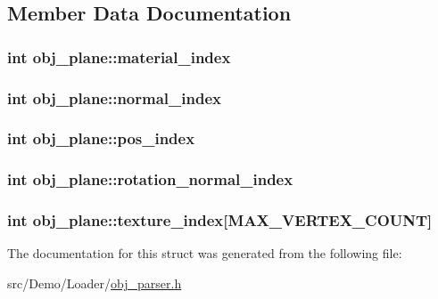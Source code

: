\subsection{Member Data Documentation}
\hypertarget{structobj__plane_ae0783771277bc7c8b2b8743015104291}{
\subsubsection[{material\+\_\+index}]{\setlength{\rightskip}{0pt plus 5cm}int obj\+\_\+plane\+::material\+\_\+index}}\label{structobj__plane_ae0783771277bc7c8b2b8743015104291}
\hypertarget{structobj__plane_acf720ed71df9e09ab0797d61ffdf7663}{
\subsubsection[{normal\+\_\+index}]{\setlength{\rightskip}{0pt plus 5cm}int obj\+\_\+plane\+::normal\+\_\+index}}\label{structobj__plane_acf720ed71df9e09ab0797d61ffdf7663}
\hypertarget{structobj__plane_abaa3eff0fff8deaa67eb4be6869b7048}{
\subsubsection[{pos\+\_\+index}]{\setlength{\rightskip}{0pt plus 5cm}int obj\+\_\+plane\+::pos\+\_\+index}}\label{structobj__plane_abaa3eff0fff8deaa67eb4be6869b7048}
\hypertarget{structobj__plane_a0c0c054b3a747f4ec2486fdf367efa36}{
\subsubsection[{rotation\+\_\+normal\+\_\+index}]{\setlength{\rightskip}{0pt plus 5cm}int obj\+\_\+plane\+::rotation\+\_\+normal\+\_\+index}}\label{structobj__plane_a0c0c054b3a747f4ec2486fdf367efa36}
\hypertarget{structobj__plane_a38a87ad9ef6583b136c8438c2bd4229b}{
\subsubsection[{texture\+\_\+index}]{\setlength{\rightskip}{0pt plus 5cm}int obj\+\_\+plane\+::texture\+\_\+index\mbox{[}{\bf M\+A\+X\+\_\+\+V\+E\+R\+T\+E\+X\+\_\+\+C\+O\+U\+N\+T}\mbox{]}}}\label{structobj__plane_a38a87ad9ef6583b136c8438c2bd4229b}


The documentation for this struct was generated from the following file\+:\begin{DoxyCompactItemize}
\item 
src/\+Demo/\+Loader/\hyperlink{obj__parser_8h}{obj\+\_\+parser.\+h}\end{DoxyCompactItemize}
